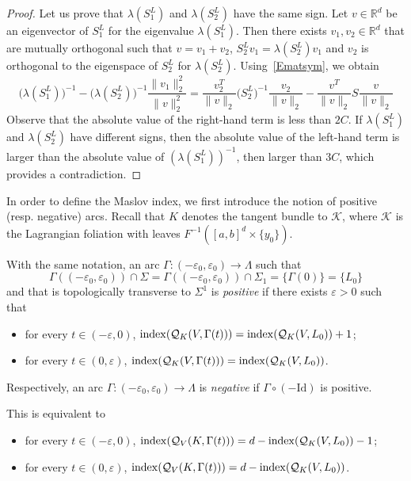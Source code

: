 \documentclass[AHL, Unicode, longabstracts, published]{cedram}
\newcommand*\cq{\mathcal{Q}}
\newcommand*\cal{\mathcal}
\newcommand{\rId}{\mathrm{Id}}
\newcommand*\R{\mathbb{R}}
\begin{document}
\begin{proof}
Let us prove that $\lambda(S_1^L)$ and $\lambda(S_2^L)$ have the same sign. Let $v\in\R^d$ be an eigenvector of $S_1^L$ for the eigenvalue $\lambda(S_1^L)$. Then there exists $v_1, v_2\in\R^d$ that are mutually orthogonal such that {$v=v_1+v_2$,} $S_2^Lv_1=\lambda(S_2^L)v_1$ and $v_2$ is orthogonal to the eigenspace of $S_2^L$ for $\lambda(S_2^L)$. Using~\eqref{Ematsym}, we obtain
\[
\big(\lambda\left(S_1^L\right)\big)^{-1}-\big(\lambda\left(S_2^L\right)\big)^{-1}\frac{\| v_1\|_2^2}{\| v\|_2^2}=\frac{v_2^T}{\| v\|_2} \big(S_2^L\big)^{-1}\frac{v_2}{\| v\|_2}- \frac{v^T}{\| v\|_2}S\frac{v}{\| v\|_2}
\]
Observe that the absolute value of the right-hand term is less than $2C$. If $\lambda(S_1^L)$ and $\lambda(S_2^L)$ have different signs, then the absolute value of the left-hand term is larger than the absolute value of $(\lambda(S_1^L))^{-1}$, then larger than $3C$, which provides a contradiction.
\end{proof}

In order to define the Maslov index, we first introduce the notion of positive (resp. negative) arcs. Recall that $K$ denotes the tangent bundle to $\cal K$, where $\cal K$ is the Lagrangian foliation with leaves $F^{-1}([a,b]^d\times\{y_0\})$.

\begin{defi}
With the same notation, an arc $\Gamma:(-\varepsilon_0, \varepsilon_0)\rightarrow \Lambda$ such that
\[
\Gamma((-\varepsilon_0,\varepsilon_0))\cap \Sigma=\Gamma((-\varepsilon_0,\varepsilon_0))\cap \Sigma_1=\{ \Gamma(0)\} =\{L_0\}
\]
and that is topologically transverse to $\Sigma^1$ is {\sl positive} if there exists $\varepsilon>0$ such that
\begin{itemize}
\item for every $t\in (-\varepsilon, 0)$, ${\rm index}(\cq_{K}(V, \Gamma(t)))={\rm index}(\cq_{K}(V, L_0))+1$;
\item for every $t\in (0, \varepsilon)$, ${\rm index}(\cq_{K}(V, \Gamma(t)))={\rm index}(\cq_{K}(V, L_0))$.
\end{itemize}
Respectively, an arc $\Gamma:(-\varepsilon_0,\varepsilon_0)\to\Lambda$ is {\sl negative} if $\Gamma\circ(-\rId)$ is positive.
\end{defi}

\begin{rema}
This is equivalent to
\begin{itemize}
\item for every $t\in (-\varepsilon, 0)$, ${\rm index}(\cq_{V}(K, \Gamma(t)))=d-{\rm index}(\cq_{K}(V, L_0))-1$;
\item for every $t\in (0, \varepsilon)$, ${\rm index}(\cq_{V}(K, \Gamma(t)))=d-{\rm index}(\cq_{K}(V, L_0))$.
\end{itemize}
\end{rema}
\end{document}
